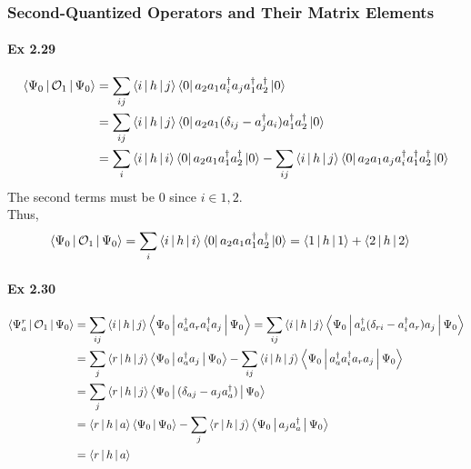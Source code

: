 \documentclass[a4paper]{article}
\newcommand{\ex}[1]{\paragraph{Ex #1}}
\numberwithin{equation}{subsection}
\begin{document}
\subsubsection{Second-Quantized Operators and Their Matrix Elements}
\ex{2.29}
\begin{equation}\label{key}
\begin{aligned}
\Braket{\Psi_0 | \mathcal{O}_1 | \Psi_0} &= \sum_{ij}\Braket{i|h|j}\Bra{0}a_2 a_1 a_i^\dagger a_j a_1^\dagger a_2^\dagger \ket{0}\\
&= \sum_{ij}\Braket{i|h|j}\Bra{0}a_2 a_1 (\delta_{ij} -  a_j^\dagger a_i) a_1^\dagger a_2^\dagger \ket{0} \\
&= \sum_i\Braket{i|h|i} \Bra{0}a_2 a_1 a_1^\dagger a_2^\dagger \ket{0} - \sum_{ij}\Braket{i|h|j}\Bra{0}a_2 a_1 a_j a_i^\dagger a_1^\dagger  a_2^\dagger \ket{0}
\end{aligned}
\end{equation}
The second terms must be $ 0 $ since $ i\in{1,2} $.\\
Thus,
\begin{equation}\label{key}
\begin{aligned}
\Braket{\Psi_0 | \mathcal{O}_1 | \Psi_0} &= \sum_i\Braket{i|h|i} \Bra{0}a_2 a_1 a_1^\dagger a_2^\dagger \ket{0} = \Braket{1|h|1} +\Braket{2|h|2}
\end{aligned}
\end{equation}

\ex{2.30}
\allowdisplaybreaks
\begin{align}
\Braket{\Psi_a^r | \mathcal{O}_1 | \Psi_0} &= \sum_{ij}\Braket{i|h|j}\Braket{\Psi_0 | a_a^\dagger a_r a_i^\dagger a_j | \Psi_0} = \sum_{ij}\Braket{i|h|j}\Braket{\Psi_0 | a_a^\dagger (\delta_{ri} -  a_i^\dagger a_r) a_j | \Psi_0}\notag\\
&= \sum_j\Braket{r|h|j}\Braket{\Psi_0 | a_a^\dagger a_j|\Psi_0} - \sum_{ij}\Braket{i|h|j}\Braket{\Psi_0 | a_a^\dagger a_i^\dagger a_r a_j | \Psi_0}\notag\\
&= \sum_j\Braket{r|h|j}\Braket{\Psi_0 | (\delta_{aj} - a_j a_a^\dagger)|\Psi_0}\notag\\
&= \Braket{r|h|a}\Braket{\Psi_0 | \Psi_0} - \sum_j\Braket{r|h|j}\Braket{\Psi_0 | a_j a_a^\dagger|\Psi_0}\notag\\
&= \Braket{r|h|a}
\end{align}
\end{document}
